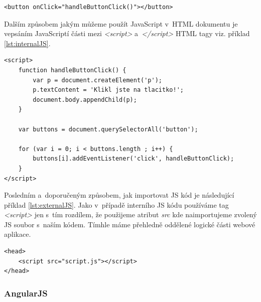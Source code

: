 \begin{lstlisting}[numbers=none, caption=Ukázka inline JS kódu, label=lst:inlineJS]
<button onClick="handleButtonClick()"></button>
\end{lstlisting}



Dalším způsobem jakým můžeme použít JavaScript v~HTML dokumentu je vepsáním JavaScriptí části mezi \textit{<script>} a~\textit{</script>} HTML tagy viz. příklad \ref{lst:internalJS}.

\pagebreak

\begin{lstlisting}[numbers=none, caption=Ukázka interního JS kódu, label=lst:internalJS]
<script>
	function handleButtonClick() {
		var p = document.createElement('p');
		p.textContent = 'Klikl jste na tlacitko!';
		document.body.appendChild(p);
	}
	
	var buttons = document.querySelectorAll('button');

	for (var i = 0; i < buttons.length ; i++) {
		buttons[i].addEventListener('click', handleButtonClick);
	}
</script>
\end{lstlisting}


Posledním a~doporučeným způsobem, jak importovat JS kód je následující příklad \ref{lst:externalJS}. Jako v~případě interního JS kódu používáme tag \textit{<script>} jen s~tím rozdílem, že použijeme atribut \textit{src} kde naimportujeme zvolený JS soubor s~naším kódem. Tímhle máme přehledně oddělené logické části webové aplikace.\cite{15}

\begin{lstlisting}[numbers=none, caption=Ukázka externího JS kódu, label=lst:externalJS]
<head>
	<script src="script.js"></script>
</head>
\end{lstlisting}


\subsubsection{AngularJS}
\label{sec:AngularJS}


